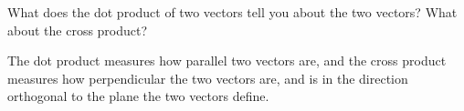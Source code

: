 What does the dot product of two vectors tell you about the two vectors? What about the cross product?

\begin{solution}
    The dot product measures how parallel two vectors are, and the cross product measures how perpendicular the two vectors are, and is in the direction orthogonal to the plane the two vectors define.
\end{solution}